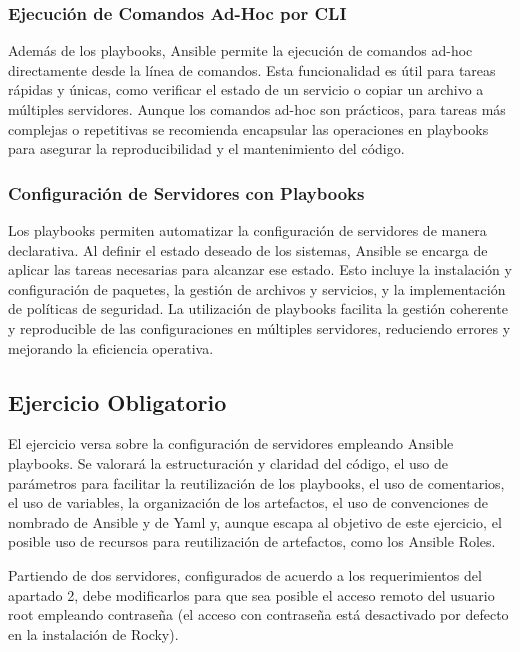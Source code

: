 \subsubsection{Ejecución de Comandos Ad-Hoc por CLI}

Además de los playbooks, Ansible permite la ejecución de comandos ad-hoc directamente desde la línea de comandos. Esta funcionalidad es útil para tareas rápidas y únicas, como verificar el estado de un servicio o copiar un archivo a múltiples servidores. Aunque los comandos ad-hoc son prácticos, para tareas más complejas o repetitivas se recomienda encapsular las operaciones en playbooks para asegurar la reproducibilidad y el mantenimiento del código.

\subsubsection{Configuración de Servidores con Playbooks}

Los playbooks permiten automatizar la configuración de servidores de manera declarativa. Al definir el estado deseado de los sistemas, Ansible se encarga de aplicar las tareas necesarias para alcanzar ese estado. Esto incluye la instalación y configuración de paquetes, la gestión de archivos y servicios, y la implementación de políticas de seguridad. La utilización de playbooks facilita la gestión coherente y reproducible de las configuraciones en múltiples servidores, reduciendo errores y mejorando la eficiencia operativa.


\subsection{Ejercicio Obligatorio}

El ejercicio versa sobre la configuración de servidores empleando Ansible playbooks. Se valorará la estructuración y claridad del código, el uso de parámetros para facilitar la reutilización de los playbooks, el uso de comentarios, el uso de variables, la organización de los artefactos, el uso de convenciones de nombrado de Ansible y de Yaml y, aunque escapa al objetivo de este ejercicio, el posible uso de recursos para reutilización de artefactos, como los Ansible Roles.

Partiendo de dos servidores, configurados de acuerdo a los requerimientos del apartado 2, debe modificarlos para que sea posible el acceso remoto del usuario root empleando contraseña (el acceso con contraseña está desactivado por defecto en la instalación de Rocky).

